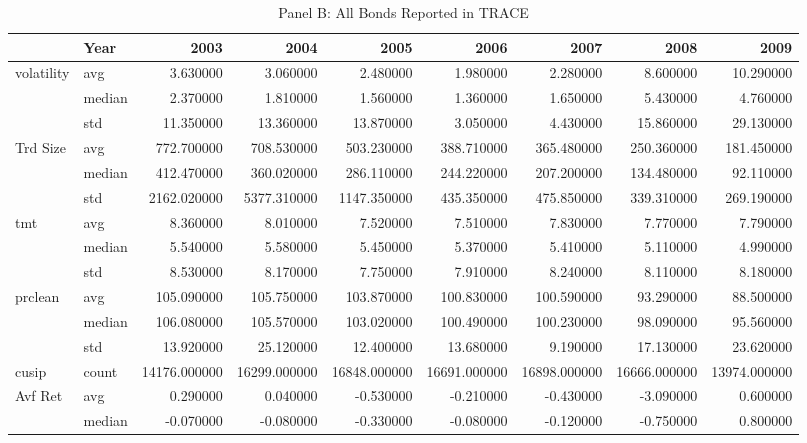 \documentclass{article}
\begin{document}
\begin{landscape}
\begin{table}[ht]
\end{table}

\begin{table}[ht]
\centering
\caption{Panel B: All Bonds Reported in TRACE}

\begin{tabular}{llrrrrrrr}
\toprule
 & Year & 2003 & 2004 & 2005 & 2006 & 2007 & 2008 & 2009 \\
\midrule
\multirow[t]{3}{*}{volatility} & avg & 3.630000 & 3.060000 & 2.480000 & 1.980000 & 2.280000 & 8.600000 & 10.290000 \\
 & median & 2.370000 & 1.810000 & 1.560000 & 1.360000 & 1.650000 & 5.430000 & 4.760000 \\
 & std & 11.350000 & 13.360000 & 13.870000 & 3.050000 & 4.430000 & 15.860000 & 29.130000 \\
\cline{1-9}
\multirow[t]{3}{*}{Trd Size} & avg & 772.700000 & 708.530000 & 503.230000 & 388.710000 & 365.480000 & 250.360000 & 181.450000 \\
 & median & 412.470000 & 360.020000 & 286.110000 & 244.220000 & 207.200000 & 134.480000 & 92.110000 \\
 & std & 2162.020000 & 5377.310000 & 1147.350000 & 435.350000 & 475.850000 & 339.310000 & 269.190000 \\
\cline{1-9}
\multirow[t]{3}{*}{tmt} & avg & 8.360000 & 8.010000 & 7.520000 & 7.510000 & 7.830000 & 7.770000 & 7.790000 \\
 & median & 5.540000 & 5.580000 & 5.450000 & 5.370000 & 5.410000 & 5.110000 & 4.990000 \\
 & std & 8.530000 & 8.170000 & 7.750000 & 7.910000 & 8.240000 & 8.110000 & 8.180000 \\
\cline{1-9}
\multirow[t]{3}{*}{prclean} & avg & 105.090000 & 105.750000 & 103.870000 & 100.830000 & 100.590000 & 93.290000 & 88.500000 \\
 & median & 106.080000 & 105.570000 & 103.020000 & 100.490000 & 100.230000 & 98.090000 & 95.560000 \\
 & std & 13.920000 & 25.120000 & 12.400000 & 13.680000 & 9.190000 & 17.130000 & 23.620000 \\
\cline{1-9}
cusip & count & 14176.000000 & 16299.000000 & 16848.000000 & 16691.000000 & 16898.000000 & 16666.000000 & 13974.000000 \\
\cline{1-9}
\multirow[t]{3}{*}{Avf Ret} & avg & 0.290000 & 0.040000 & -0.530000 & -0.210000 & -0.430000 & -3.090000 & 0.600000 \\
 & median & -0.070000 & -0.080000 & -0.330000 & -0.080000 & -0.120000 & -0.750000 & 0.800000 \\

\end{tabular}
\end{table}
\end{landscape}
\end{document}

